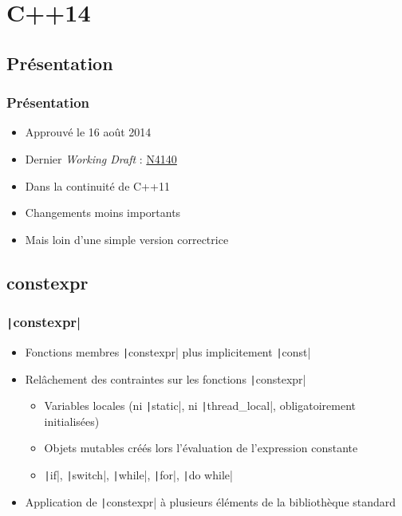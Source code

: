 \documentclass[C++.tex]{subfiles}
\begin{document}
\section{C++14}
\subsection*{Présentation}
\begin{frame}
	\frametitle{Présentation}
	\begin{itemize}
		\item Approuvé le 16 août 2014
		\item Dernier \textit{Working Draft} : \href{https://timsong-cpp.github.io/cppwp/n4140/draft.pdf}{N4140\linklogo}
		\item Dans la continuité de C++11
		\item Changements moins importants
		\item Mais loin d'une simple version correctrice
	\end{itemize}
\end{frame}

\subsection*{constexpr}
\begin{frame}[fragile]
	\frametitle{\texttt|constexpr|}
	\begin{itemize}
		\item Fonctions membres \texttt|constexpr| plus implicitement \texttt|const|
		\item Relâchement des contraintes sur les fonctions \texttt|constexpr|
		\begin{itemize}
			\item Variables locales (ni \texttt|static|, ni \texttt|thread_local|, obligatoirement initialisées)
			\item Objets mutables créés lors l'évaluation de l'expression constante
			\item \texttt|if|, \texttt|switch|, \texttt|while|, \texttt|for|, \texttt|do while|
		\end{itemize}
		\item Application de \texttt|constexpr| à plusieurs éléments de la bibliothèque standard
	\end{itemize}
\end{frame}
\end{document}
